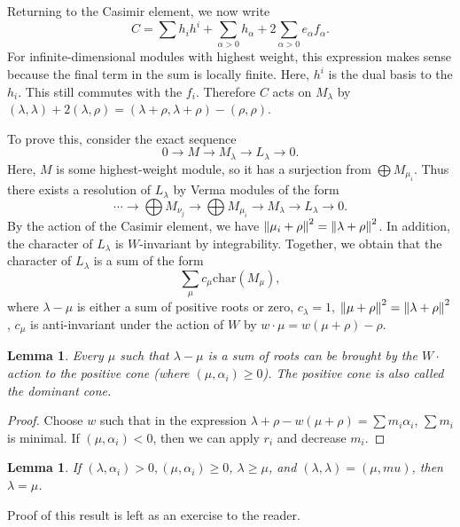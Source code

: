 \documentclass[leqno, openany]{memoir}
\newtheorem{lem}[thm]{Lemma}
\theoremstyle{definition}
\theoremstyle{remark}
\theoremstyle{plain}
\theoremstyle{definition}
\theoremstyle{remark}
\newcommand{\mr}[1]{\mathrm{#1}}
\begin{document}
Returning to the Casimir element, we now write \[ C = \sum h_i h^i +
\sum_{\alpha > 0} h_{\alpha} + 2 \sum_{\alpha > 0} e_{\alpha} f_{\alpha}. \]
For infinite-dimensional modules with highest weight, this expression makes
sense because the final term in the sum is locally finite. Here, $h^i$ is the
dual basis to the $h_i$. This still commutes with the $f_i$. Therefore $C$ acts
on $M_{\lambda}$ by $(\lambda, \lambda) + 2 (\lambda, \rho) = (\lambda + \rho,
\lambda + \rho) - (\rho, \rho)$.

To prove this, consider the exact sequence \[ 0 \to M \to M_{\lambda} \to
L_{\lambda} \to 0. \] Here, $M$ is some highest-weight module, so it has a
surjection from $\bigoplus M_{\mu_i}$. Thus there exists a resolution of
$L_{\lambda}$ by Verma modules of the form \[ \cdots \to \bigoplus M_{\nu_j}
\to \bigoplus M_{\mu_i} \to M_{\lambda} \to L_{\lambda} \to 0. \] By the action
of the Casimir element, we have $\norm{\mu_i + \rho}^2 = \norm{\lambda +
\rho}^2$. In addition, the character of $L_{\lambda}$ is $W$-invariant by
integrability. Together, we obtain that the character of $L_{\lambda}$ is a sum
of the form \[ \sum_{\mu} c_{\mu} \mr{char}(M_{\mu}), \] where $\lambda - \mu$
is either a sum of positive roots or zero, $c_{\lambda} = 1$, $\norm{\mu +
\rho}^2 = \norm{\lambda + \rho}^2$, $c_{\mu}$ is anti-invariant under the
action of $W$ by $w \cdot \mu = w(\mu +\rho)-\rho$.

\begin{lem} Every $\mu$ such that $\lambda - \mu$ is a sum of roots can be
brought by the $W \cdot$ action to the positive cone (where $(\mu,\alpha_i)
\geq 0$). The positive cone is also called the dominant cone.  \end{lem}

\begin{proof} Choose $w$ such that in the expression $\lambda + \rho - w(\mu +
\rho) = \sum m_i \alpha_i$, $\sum m_i$ is minimal. If $(\mu, \alpha_i) < 0$,
then we can apply $r_i$ and decrease $m_i$.  \end{proof}

\begin{lem} If $(\lambda, \alpha_i) > 0, (\mu, \alpha_i) \geq 0$, $\lambda \geq
\mu$, and $(\lambda, \lambda) = (\mu, mu)$, then $\lambda = \mu$.  \end{lem}

Proof of this result is left as an exercise to the reader.
\end{document}
